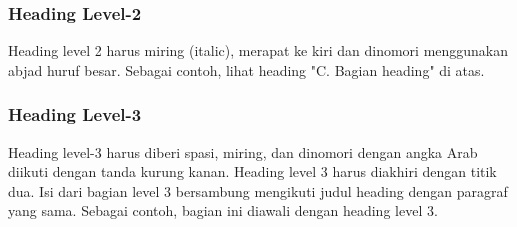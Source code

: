 \subsubsection{Heading Level-2} Heading level 2 harus miring (italic), merapat ke kiri dan dinomori menggunakan abjad huruf besar. Sebagai contoh, lihat heading "C. Bagian heading" di atas.

\subsubsection{Heading Level-3} Heading level-3 harus diberi spasi, miring, dan dinomori dengan angka Arab diikuti dengan tanda kurung kanan. Heading level 3 harus diakhiri dengan titik dua. Isi dari bagian level 3 bersambung mengikuti judul heading dengan paragraf yang sama. Sebagai contoh, bagian ini diawali dengan heading level 3.


